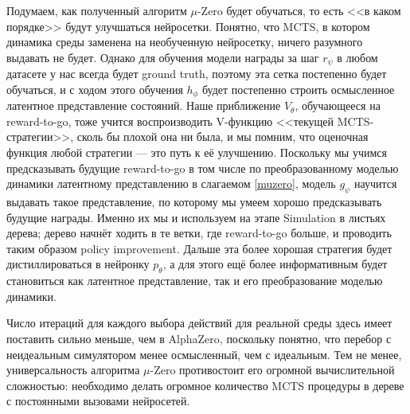 Подумаем, как полученный алгоритм $\mu$-Zero будет обучаться, то есть <<в каком порядке>> будут улучшаться нейросетки. Понятно, что MCTS, в котором динамика среды заменена на необученную нейросетку, ничего разумного выдавать не будет. Однако для обучения модели награды за шаг $r_{\psi}$ в любом датасете у нас всегда будет ground truth, поэтому эта сетка постепенно будет обучаться, и с ходом этого обучения $h_{\phi}$ будет постепенно строить осмысленное латентное представление состояний. Наше приближение $V_{\theta}$, обучающееся на reward-to-go, тоже учится воспроизводить V-функцию <<текущей MCTS-стратегии>>, сколь бы плохой она ни была, и мы помним, что оценочная функция любой стратегии --- это путь к её улучшению. Поскольку мы учимся предсказывать будущие reward-to-go в том числе по преобразованному моделью динамики латентному представлению в слагаемом \eqref{muzero}, модель $g_{\psi}$ научится выдавать такое представление, по которому мы умеем хорошо предсказывать будущие награды. Именно их мы и используем на этапе Simulation в листьях дерева; дерево начнёт ходить в те ветки, где reward-to-go больше, и проводить таким образом policy improvement. Дальше эта более хорошая стратегия будет дистиллироваться в нейронку $p_{\theta}$, а для этого ещё более информативным будет становиться как латентное представление, так и его преобразование моделью динамики.

\begin{remark}
Число итераций для каждого выбора действий для реальной среды здесь имеет поставить сильно меньше, чем в AlphaZero, поскольку понятно, что перебор с неидеальным симулятором менее осмысленный, чем с идеальным. Тем не менее, универсальность алгоритма $\mu$-Zero противостоит его огромной вычислительной сложностью: необходимо делать огромное количество MCTS процедуры в дереве с постоянными вызовами нейросетей. 
\end{remark}